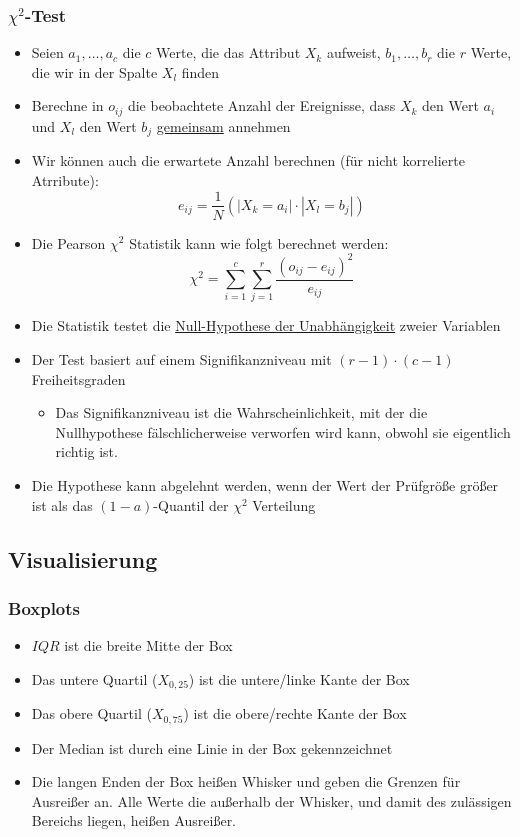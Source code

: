 \documentclass{scrartcl}
\begin{document}
\subsubsection{$ \chi^2 $-Test}

\begin{itemize}
	\item Seien $ a_1,\ldots,a_c $ die $ c $ Werte, die das Attribut $ X_k $ 
	aufweist, $ b_1,\ldots,b_r $ die $ r $ Werte, die wir in der Spalte $ X_l $ 
	finden
	\item Berechne in $ o_{ij} $ die beobachtete Anzahl der Ereignisse, dass $ 
	X_k $ den Wert $ a_i $ und $ X_l $ den Wert $ b_j $ \underline{gemeinsam} 
	annehmen
	\item Wir können auch die erwartete Anzahl berechnen (für nicht korrelierte 
	Atrribute):
	\[ e_{ij} = \frac{1}{N} (|X_k=a_i| \cdot |X_l=b_j|) \]
	\item Die Pearson $ \chi^2 $ Statistik kann wie folgt berechnet werden:
	\[ \chi^2 = \sum_{i=1}^{c} \sum_{j=1}^{r} \frac{(o_{ij} - 
	e_{ij})^2}{e_{ij}} \]
	\item Die Statistik testet die \underline{Null-Hypothese der 
	Unabhängigkeit} zweier Variablen
	\item Der Test basiert auf einem Signifikanzniveau mit $ (r-1) \cdot (c-1) 
	$ Freiheitsgraden
	\begin{itemize}
		\item Das Signifikanzniveau ist die Wahrscheinlichkeit, mit der die 
		Nullhypothese fälschlicherweise verworfen wird kann, obwohl sie 
		eigentlich richtig ist.
	\end{itemize}
	\item Die Hypothese kann abgelehnt werden, wenn der Wert der Prüfgröße 
	größer ist als das $ (1-a) $-Quantil der $ \chi^2 $ Verteilung
\end{itemize}

\subsection{Visualisierung}

\subsubsection{Boxplots}

\begin{itemize}
	\item $ IQR $ ist die breite Mitte der Box
	\item Das untere Quartil ($ X_{0,25} $) ist die untere/linke Kante der Box
	\item Das obere Quartil ($ X_{0,75} $) ist die obere/rechte Kante der Box
	\item Der Median ist durch eine Linie in der Box gekennzeichnet
	\item Die langen Enden der Box heißen Whisker und geben die Grenzen für 
	Ausreißer an. Alle Werte die außerhalb der Whisker, und damit des 
	zulässigen Bereichs liegen, heißen Ausreißer.
\end{itemize}
\end{document}

